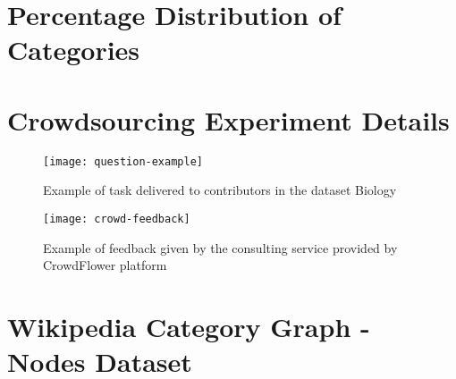 \begin{appendices}





\chapter{Percentage Distribution of Categories}
\label{app:percentagem-distribution}




\chapter{Crowdsourcing Experiment Details}
\label{app:crowd-details}
\begin{figure}[htpb]
\centering
  \texttt{[image: question-example]}
  \caption{Example of task delivered to contributors in the dataset Biology}
  \label{fig:example-question}
\end{figure}


\begin{figure}[htpb]
\centering
  \texttt{[image: crowd-feedback]}
  \caption{Example of feedback given by the consulting service provided by CrowdFlower platform}
  \label{fig:example-feedback}
\end{figure}


\chapter{Wikipedia Category Graph - Nodes Dataset}
\label{app:dataset-categories}




\end{appendices}